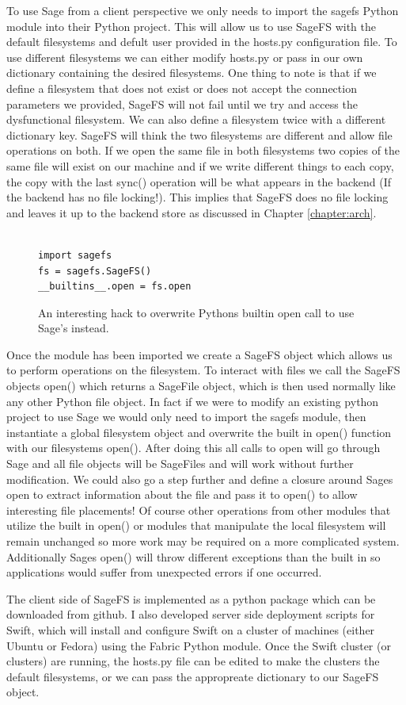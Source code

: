 To use Sage from a client perspective we only needs to import the sagefs
Python module into their Python project. This will allow us to use SageFS with
the default filesystems and defult user provided in the hosts.py configuration
file. To use different filesystems we can either modify hosts.py or pass in
our own dictionary containing the desired filesystems. One thing to note is
that if we define a filesystem that does not exist or does not accept the
connection parameters we provided, SageFS will not fail until we try and
access the dysfunctional filesystem. We can also define a filesystem twice
with a different dictionary key. SageFS will think the two filesystems are
different and allow file operations on both. If we open the same file in both
filesystems two copies of the same file will exist on our machine and if we
write different things to each copy, the copy with the last sync() operation
will be what appears in the backend (If the backend has no file locking!).
This implies that SageFS does no file locking and leaves it up to the backend
store as discussed in Chapter \ref{chapter:arch}.

\begin{figure}[h]
\begin{lstlisting}

import sagefs
fs = sagefs.SageFS()
__builtins__.open = fs.open

\end{lstlisting}
\caption[SageFS Open Hack]{An interesting hack to overwrite Pythons builtin open call to use Sage's instead.}
\label{fig:sagepythonhack}
\end{figure}

Once the module has been imported we create a SageFS object which allows us to
perform operations on the filesystem. To interact with files we call the
SageFS objects open() which returns a SageFile object, which is then used
normally like any other Python file object. In fact if we were to modify an
existing python project to use Sage we would only need to import the sagefs
module, then instantiate a global filesystem object and overwrite the built in
open() function with our filesystems open(). After doing this all calls to
open will go through Sage and all file objects will be SageFiles and will work
without further modification. We could also go a step further and define a
closure around Sages open to extract information about the file and pass it to
open() to allow interesting file placements! Of course other operations from
other modules that utilize the built in open() or modules that manipulate the
local filesystem will remain unchanged so more work may be required on a more
complicated system. Additionally Sages open() will throw different exceptions
than the built in so applications would suffer from unexpected errors if one
occurred.

The client side of SageFS is implemented as a python package which can be
downloaded from github. I also developed server side deployment scripts for
Swift, which will install and configure Swift on a cluster of machines (either
Ubuntu or Fedora) using the Fabric Python module. Once the Swift cluster (or
clusters) are running, the hosts.py file can be edited to make the clusters
the default filesystems, or we can pass the appropreate dictionary to our
SageFS object.
